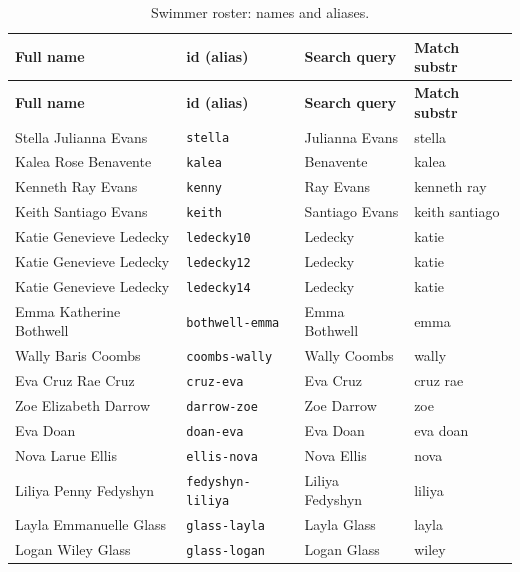 \documentclass[12pt]{article}
\newcommand{\code}[1]{\texttt{#1}}
\begin{document}
\begin{longtable}{@{}l l l l@{}}
  \caption{Swimmer roster: names and aliases.}\label{tab:roster}\\
  \toprule
  \textbf{Full name} & \textbf{id (alias)} & \textbf{Search query}
    & \textbf{Match substr} \\
  \midrule
  \endfirsthead
  \toprule
  \textbf{Full name} & \textbf{id (alias)} & \textbf{Search query}
    & \textbf{Match substr} \\
  \midrule
  \endhead
  \bottomrule
  \endfoot
  Stella Julianna Evans   & \code{stella}              & Julianna Evans  & stella \\
  Kalea Rose Benavente    & \code{kalea}               & Benavente       & kalea \\
  Kenneth Ray Evans       & \code{kenny}               & Ray Evans       & kenneth ray \\
  Keith Santiago Evans    & \code{keith}               & Santiago Evans  & keith santiago \\
  Katie Genevieve Ledecky & \code{ledecky10}           & Ledecky         & katie \\
  Katie Genevieve Ledecky & \code{ledecky12}           & Ledecky         & katie \\
  Katie Genevieve Ledecky & \code{ledecky14}           & Ledecky         & katie \\
  Emma Katherine Bothwell & \code{bothwell-emma}       & Emma Bothwell        & emma \\
  Wally Baris Coombs      & \code{coombs-wally}        & Wally Coombs         & wally \\
  Eva Cruz Rae Cruz       & \code{cruz-eva}            & Eva Cruz             & cruz rae \\
  Zoe Elizabeth Darrow    & \code{darrow-zoe}          & Zoe Darrow           & zoe \\
  Eva Doan                & \code{doan-eva}            & Eva Doan             & eva doan \\
  Nova Larue Ellis        & \code{ellis-nova}          & Nova Ellis           & nova \\
  Liliya Penny Fedyshyn   & \code{fedyshyn-liliya}     & Liliya Fedyshyn      & liliya \\
  Layla Emmanuelle Glass  & \code{glass-layla}         & Layla Glass          & layla \\
  Logan Wiley Glass       & \code{glass-logan}         & Logan Glass          & wiley \\

\end{longtable}
\end{document}
